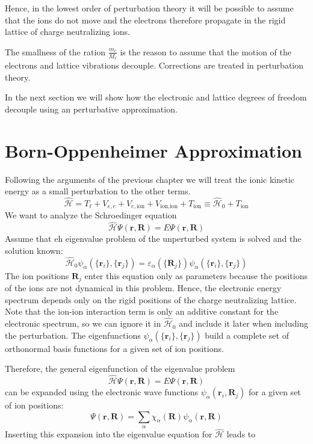 \documentclass[11pt]{book}
\renewcommand{\vec}[1]{\bm{#1}}
\renewcommand{\H}{\hat{\mathcal{H}}}
\newcommand{\ion}{\text{ion}}
\begin{document}
Hence, in the lowest order of perturbation theory it will be possible to assume that the ions do not move and the electrons therefore propagate in the rigid lattice of charge neutralizing ions.

The smallness of the ration $ \frac{m_e}{M_{\ell}} $ is the reason to assume that the motion of the electrons and lattice vibrations decouple. Corrections are treated in perturbation theory. 

In the next section we will show how the electronic and lattice degrees of freedom decouple using an perturbative approximation.


\section{Born-Oppenheimer Approximation}

Following the arguments of the previous chapter we will treat the ionic kinetic energy as a small perturbation to the other terms.
\begin{equation}
  \H = T_{\ell} + V_{e,e} + V_{e,\ion} + V_{\ion, \ion} + T_{\ion} \equiv \H_0 + T_{\ion}
\end{equation}
We want to analyze the Schroedinger equation
\begin{equation}
  \H \Psi(\vec{r},\vec{R}) = E \Psi(\vec{r},\vec{R})
\end{equation}
Assume that eh eigenvalue problem of the unperturbed system is solved and the solution known:
\begin{equation}
  \H_0 \psi_{\alpha}\left( \{\vec{r}_i\}, \{ \vec{r}_j\} \right) = \varepsilon_{\alpha}\left( \{\vec{R}_j\}\right) \psi_{\alpha}\left( \{\vec{r}_i\}, \{ \vec{r}_j\} \right)
\end{equation}
The ion positions $ \vec{R}_j $  enter this equation only as parameters because the positions of the ions are not dynamical in this problem. Hence, the electronic energy spectrum depends only on the rigid positions of the charge neutralizing lattice. Note that the ion-ion interaction term is only an additive constant for the electronic spectrum, so we can ignore it in $ \H_0 $ and include it later when including the perturbation. The eigenfunctions $ \psi_{\alpha}\left( \{\vec{r}_i\}, \{ \vec{r}_j\} \right) $ build a complete set of orthonormal basis functions for a given set of ion positions. 

Therefore, the general eigenfunction of the eigenvalue problem 
\begin{equation}
  \H \Psi \left( \vec{r}, \vec{R} \right) = E \Psi \left( \vec{r}, \vec{R} \right)
\end{equation}
can be expanded using the electronic wave functions $ \psi_{\alpha} \left( \vec{r}_i, \vec{R}_j \right) $ for a given set of ion positions:
\begin{equation}
  \Psi \left( \vec{r}, \vec{R} \right) = \sum_{\alpha} \chi_{\alpha}\left( \vec{R} \right) \psi_{\alpha} \left( \vec{r}, \vec{R} \right)
\end{equation}
Inserting this expansion into the eigenvalue equation for $ \H $ leads to 
\end{document}
